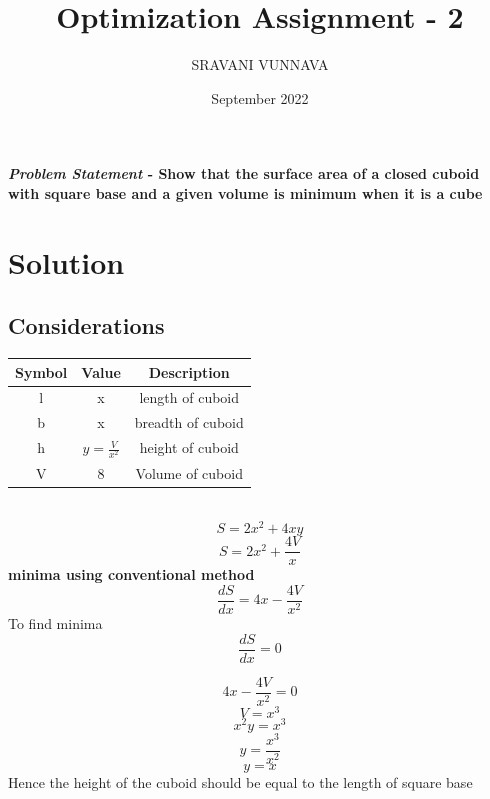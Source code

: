 \documentclass[journal,10pt,twocolumn]{article}
\title{\textbf{Optimization Assignment - 2}}
\author{SRAVANI VUNNAVA}
\date{September 2022}
\begin{document}
\maketitle
\paragraph{\textit{Problem Statement} - Show that the surface area of a closed cuboid with square base and a given volume is minimum when it is a cube }
\section*{\large Solution}
\subsection{\textbf{Considerations}}


\begin{tabular}{|c|c|c|}
 \hline
 \textbf{Symbol}&\textbf{Value}&\textbf{Description}\\
 \hline
 l&x&length of cuboid\\
 \hline
 b&x&breadth of cuboid\\
 \hline
	h&$y=\frac{V}{x^2}$&height of cuboid\\
\hline
V&8&Volume of cuboid\\
\hline
\end{tabular}\\
 \begin{equation}
        S = 2x^2+4xy
    \end{equation}
    \begin{equation}
        S = 2x^2 + \frac{4V}{x}
    \end{equation}
    \textbf{minima using conventional method}
    \begin{equation}
        \frac{dS}{dx} = 4x - \frac{4V}{x^2}
    \end{equation}
To find minima
    \begin{equation}
	    \frac{dS}{dx} = 0
	    \end{equation}

	    \begin{equation}
4x - \frac{4V}{x^2} = 0
	    \end{equation}
    \begin{equation}
        V = x^3
    \end{equation}
    \begin{equation}
        x^2y = x^3
    \end{equation}
    \begin{equation}
        y = \frac{x^3}{x^2}
    \end{equation}
    \begin{equation}
        y = x
    \end{equation}
    Hence the height of the cuboid should be equal to the length of square base
\end{document}

